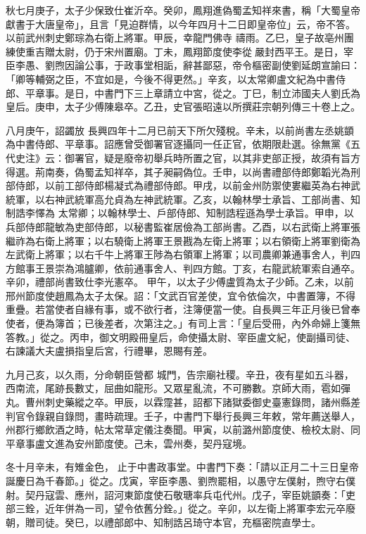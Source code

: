 \begin{pinyinscope}
 秋七月庚子，太子少保致仕崔沂卒。癸卯，鳳翔進偽蜀孟知祥來書，稱「大蜀皇帝獻書于大唐皇帝」，且言「見迫群情，以今年四月十二日即皇帝位」云，帝不答。以前武州刺史鄭琮為右衛上將軍。甲辰，幸龍門佛寺
 禱雨。乙巳，皇子故亳州團練使重吉贈太尉，仍于宋州置廟。丁未，鳳翔節度使李從嚴封西平王。是日，宰臣李愚、劉煦因論公事，于政事堂相詬，辭甚鄙惡，帝令樞密副使劉延朗宣諭曰：「卿等輔弼之臣，不宜如是，今後不得更然。」辛亥，以太常卿盧文紀為中書侍郎、平章事。是日，中書門下三上章請立中宮，從之。丁巳，制立沛國夫人劉氏為皇后。庚申，太子少傅陳皋卒。乙丑，史官張昭遠以所撰莊宗朝列傳三十卷上之。



 八月庚午，詔蠲放
 長興四年十二月已前天下所欠殘稅。辛未，以前尚書左丞姚顗為中書侍郎、平章事。詔應曾受御署官逐攝同一任正官，依期限赴選。徐無黨《五代史注》云：御署官，疑是廢帝初舉兵時所置之官，以其非吏部正授，故須有旨方得選。荊南奏，偽蜀孟知祥卒，其子昶嗣偽位。壬申，以尚書禮部侍郎鄭韜光為刑部侍郎，以前工部侍郎楊凝式為禮部侍郎。甲戌，以前金州防禦使婁繼英為右神武統軍，以右神武統軍高允貞為左神武統軍。乙亥，以翰林學士承旨、工部尚書、知制誥李懌為
 太常卿；以翰林學士、戶部侍郎、知制誥程遜為學士承旨。甲申，以兵部侍郎龍敏為吏部侍郎，以秘書監崔居儉為工部尚書。乙酉，以右武衛上將軍張繼祚為右衛上將軍；以右驍衛上將軍王景戡為左衛上將軍；以右領衛上將軍劉衛為左武衛上將軍；以右千牛上將軍王陟為右領軍上將軍；以司農卿兼通事舍人，判四方館事王景崇為鴻臚卿，依前通事舍人、判四方館。丁亥，右龍武統軍索自通卒。辛卯，禮部尚書致仕李光憲卒。
 甲午，以太子少傅盧質為太子少師。乙未，以前邢州節度使趙鳳為太子太保。詔：「文武百官差使，宜令依倫次，中書置簿，不得重疊。若當使者自緣有事，或不欲行者，注簿便當一使。自長興三年正月後已曾奉使者，便為簿首；已後差者，次第注之。」有司上言：「皇后受冊，內外命婦上箋無答教。」從之。丙申，御文明殿冊皇后，命使攝太尉、宰臣盧文紀，使副攝司徒、右諫議大夫盧損指皇后宮，行禮畢，恩賜有差。



 九月己亥，以久雨，分命朝臣營都
 城門，告宗廟社稷。辛丑，夜有星如五斗器，西南流，尾跡長數丈，屈曲如龍形。又眾星亂流，不可勝數。京師大雨，雹如彈丸。曹州刺史藥縱之卒。甲辰，以霖霪甚，詔都下諸獄委御史臺憲錄問，諸州縣差判官令錄親自錄問，畫時疏理。壬子，中書門下舉行長興三年敕，常年薦送舉人，州郡行鄉飲酒之時，帖太常草定儀注奏聞。甲寅，以前潞州節度使、檢校太尉、同平章事盧文進為安州節度使。己未，雲州奏，契丹寇境。



 冬十月辛未，有雉金色，
 止于中書政事堂。中書門下奏：「請以正月二十三日皇帝誕慶日為千春節。」從之。戊寅，宰臣李愚、劉煦罷相，以愚守左僕射，煦守右僕射。契丹寇雲、應州，詔河東節度使石敬瑭率兵屯代州。戊子，宰臣姚顗奏：「吏部三銓，近年併為一司，望令依舊分銓。」從之。辛卯，以左衛上將軍李宏元卒廢朝，贈司徒。癸巳，以禮部郎中、知制誥呂琦守本官，充樞密院直學士。




\end{pinyinscope}
